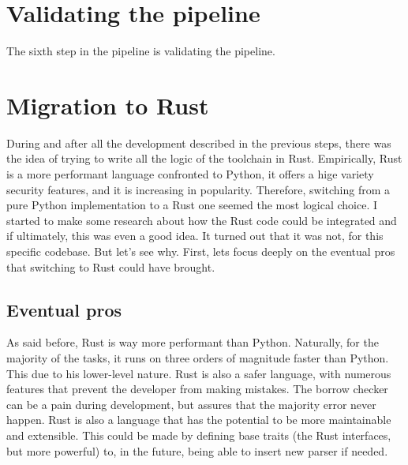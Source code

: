 \section{Validating the pipeline}
\label{cha:Validating the pipeline} The sixth step in the pipeline is validating
the pipeline.

\section{Migration to Rust}
\label{cha:Migration to Rust} During and after all the development described in the
previous steps, there was the idea of trying to write all the logic of the
toolchain in Rust. Empirically, Rust is a more performant language confronted to
Python, it offers a hige variety security features, and it is increasing in
popularity. Therefore, switching from a pure Python implementation to a Rust one
seemed the most logical choice. I started to make some research about how the Rust
code could be integrated and if ultimately, this was even a good idea. It turned
out that it was not, for this specific codebase. But let's see why. First, lets focus
deeply on the eventual pros that switching to Rust could have brought.

\subsection[Eventual pros]{Eventual pros}
As said before, Rust is way more performant than Python. Naturally, for the
majority of the tasks, it runs on three orders of magnitude faster than Python.
This due to his lower-level nature. Rust is also a safer language, with numerous
features that prevent the developer from making mistakes. The borrow checker can
be a pain during development, but assures that the majority error never happen. Rust
is also a language that has the potential to be more maintainable and extensible.
This could be made by defining base traits (the Rust interfaces, but more
powerful) to, in the future, being able to insert new parser if needed.


